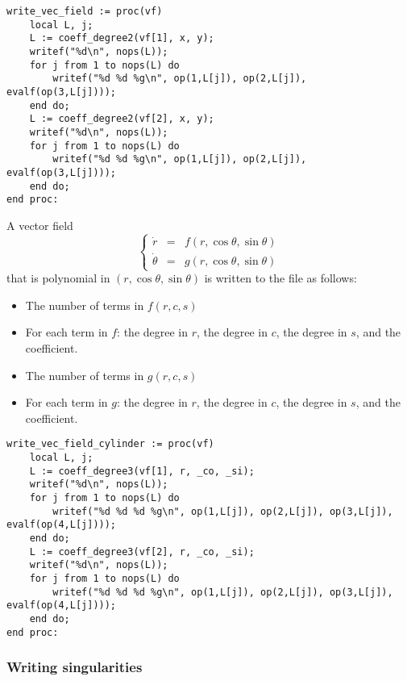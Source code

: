 \documentclass[a4paper,10pt]{article}
\begin{document}
\begin{lstlisting}[name=writelog]
write_vec_field := proc(vf)
    local L, j;
    L := coeff_degree2(vf[1], x, y);
    writef("%d\n", nops(L));
    for j from 1 to nops(L) do
        writef("%d %d %g\n", op(1,L[j]), op(2,L[j]), evalf(op(3,L[j])));
    end do;
    L := coeff_degree2(vf[2], x, y);
    writef("%d\n", nops(L));
    for j from 1 to nops(L) do
        writef("%d %d %g\n", op(1,L[j]), op(2,L[j]), evalf(op(3,L[j])));
    end do;
end proc:
\end{lstlisting}

A vector field
\[
    \left\{\begin{array}{rcl}
        \dot{r} & = & f(r,\cos\theta,\sin\theta)    \\
        \dot{\theta} & =& g(r,\cos\theta,\sin\theta)
    \end{array}\right.
\]
that is polynomial in $(r,\cos\theta,\sin\theta)$ is written to the file as follows:
\begin{itemize}
\item
    The number of terms in $f(r,c,s)$
\item
    For each term in $f$: the degree in $r$, the degree in $c$, the degree in $s$, and the coefficient.
\item
    The number of terms in $g(r,c,s)$
\item
    For each term in $g$: the degree in $r$, the degree in $c$, the degree in $s$, and the coefficient.
\end{itemize}

\begin{lstlisting}[name=writelog]
write_vec_field_cylinder := proc(vf)
    local L, j;
    L := coeff_degree3(vf[1], r, _co, _si);
    writef("%d\n", nops(L));
    for j from 1 to nops(L) do
        writef("%d %d %d %g\n", op(1,L[j]), op(2,L[j]), op(3,L[j]), evalf(op(4,L[j])));
    end do;
    L := coeff_degree3(vf[2], r, _co, _si);
    writef("%d\n", nops(L));
    for j from 1 to nops(L) do
        writef("%d %d %d %g\n", op(1,L[j]), op(2,L[j]), op(3,L[j]), evalf(op(4,L[j])));
    end do;
end proc:
\end{lstlisting}

\subsubsection{Writing singularities}
\end{document}
